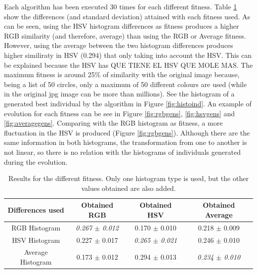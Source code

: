 \documentclass[conference]{IEEEtran}
\begin{document}
Each algorithm has been executed 30 times for each different fitness. Table \ref{tab:results} show the differences (and standard deviation) attained with each fitness used. As can be seen, using the HSV histogram differences as fitness produces a higher RGB similarity (and therefore, average) than using the RGB or Average fitness. However, using the average between the two histogram differences produces higher similiraty in HSV (0.294) that only taking into account the HSV. This can be explained because the HSV has QUE TIENE EL HSV QUE MOLE MAS. The maximum fitness is around 25\% of similarity with the original image because, being a list of 50 circles, only a maximum of 50 different colours are used (while in the original jpg image can be more than millions). See the histogram of a generated best individual by the algorithm in Figure \ref{fig:histoind}. An example of evolution for each fitness can be see in Figure \ref{fig:rgbgens}, \ref{fig:hsvgens} and \ref{fig:averagegens}. Comparing with the RGB histogram as fitness, a more fluctuation in the HSV is produced (Figure \ref{fig:rgbgens}). Although there are the same information in both histograms, the transformation from one to another is not linear, so there is no relation with the histograms of individuals generated during the evolution.

\begin{table}
\centering
\caption{Results for the different fitness. Only one histogram type is used, but the other values obtained are also added.}
\begin{tabular}{|c|c|c|c|} \hline
Differences used & Obtained RGB      		& Obtained HSV  & Obtained Average \\ \hline
RGB Histogram    & {\em 0.267 $\pm$ 0.012}	& 0.170 $\pm$ 0.010 	& 0.218 $\pm$ 0.009	\\ \hline
HSV Histogram    & 0.227 $\pm$ 0.017	& {\em 0.265 $\pm$ 0.021}	& 0.246 $\pm$ 0.010 \\ \hline
Average Histogram& 0.173 $\pm$ 0.012	& 0.294 $\pm$ 0.013	& {\em 0.234 $\pm$ 0.010} \\ \hline
\end{tabular}
\label{tab:results}
\end{table}
\end{document}
